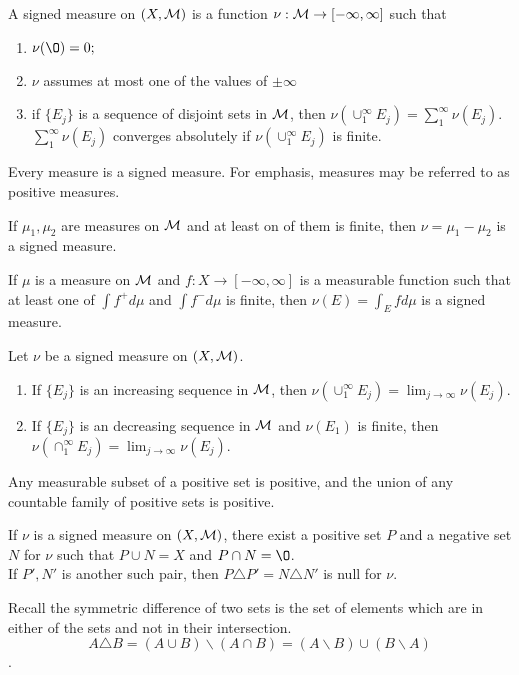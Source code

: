 \begin{dfn}
A signed measure on $(X, {\mathcal M})$ is a function $\nu: {\mathcal M} \rightarrow [-\infty, \infty]$ such that
\begin{enumerate}
	\item $\nu(\O)=0;$
	\item $\nu$ assumes at most one of the values of $\pm \infty$
	\item if $\{E_j\}$ is a sequence of disjoint sets in ${\mathcal M}$, then $\nu(\cup_1^\infty E_j) = \sum_1^\infty \nu(E_j)$. $\sum_1^\infty \nu(E_j)$ converges absolutely if $\nu(\cup_1^\infty E_j)$ is finite. 
\end{enumerate}
\end{dfn}
\begin{rmk}
Every measure is a signed measure. For emphasis, measures may be referred to as positive measures.	
\end{rmk}

\begin{example}
If $\mu_1, \mu_2$ are measures on ${\mathcal M}$ and at least on of them is finite, then $\nu=\mu_1 - \mu_2$ is a signed measure.	
\end{example}

\begin{example}
If $\mu$ is a measure on ${\mathcal M}$ and $f: X \rightarrow [-\infty, \infty]$ is a measurable function such that at least one of $\int f^+ d \mu$ and $\int f^- d \mu$ is finite, then $\nu(E)=\int_E f d \mu$ is a signed measure.	
\end{example}

\begin{prop}
Let $\nu$ be a signed measure on $(X, {\mathcal M})$. 
\begin{enumerate}
\item If $\{E_j\}$ is an increasing sequence in ${\mathcal M}$, then $\nu(\cup_1^\infty E_j)=\lim_{j \rightarrow \infty} \nu(E_j)$.
\item If 	$\{E_j\}$ is an decreasing sequence in ${\mathcal M}$ and $\nu(E_1)$ is finite, then $\nu(\cap_1^\infty E_j)=\lim_{j \rightarrow \infty} \nu(E_j)$.
\end{enumerate}
\end{prop}

\begin{lem}
Any measurable subset of a positive set is positive, and the union of any countable family of positive sets is positive.	
\end{lem}

\begin{thm}
If $\nu$ is a signed measure on $(X, {\mathcal M})$, there exist a positive set $P$ and a negative set $N$ for $\nu$ such that $P \cup N= X$ and $P \cap N= \O$. \\
If $P', N'$ is another such pair, then $P \triangle P' = N \triangle N'$ is null for $\nu$.	
\end{thm}
\begin{rmk}
Recall the symmetric difference of two sets is the set of elements which are in either of the sets and not in their intersection.  $$A \triangle B = (A \cup B) \backslash (A \cap B) = (A \backslash B) \cup (B \backslash A)$$.	  
\end{rmk}

